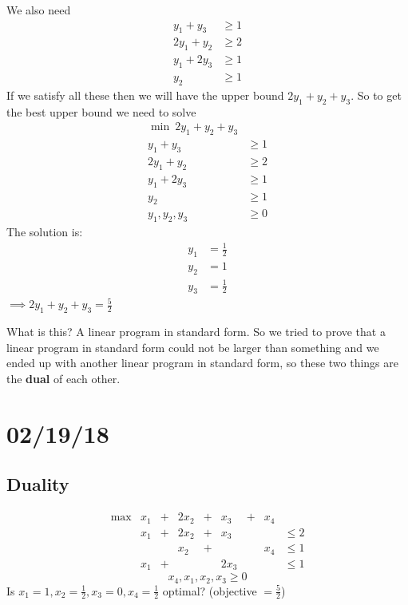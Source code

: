 \documentclass[12 pt]{article}
\begin{document}
          We also need
          \begin{align*}
            y_1 + y_3 & \geq 1
            \\ 2y_1 + y_2 & \geq 2
            \\ y_1 + 2y_3 & \geq 1
            \\ y_2 & \geq 1
          \end{align*}
          If we satisfy all these then we will have the upper bound
          $2y_1+y_2 + y_3$. So to get the best upper bound we need to
          solve
          \begin{align*}
            \min \ 2y_1 + y_2 + y_3 &
            \\ y_1 + y_3 & \geq 1
            \\ 2y_1 + y_2 & \geq 2
            \\ y_1 + 2y_3 & \geq 1
            \\ y_2 & \geq 1
            \\ y_1, y_2, y_3 & \geq 0
          \end{align*}
          The solution is:
          \begin{align*}
            y_1 & = \frac{1}{2}
            \\ y_2 & = 1
            \\ y_3 & = \frac{1}{2}
          \end{align*}
          $\implies 2y_1 + y_2 + y_3 = \frac{5}{2}$

          What is this? A linear program in standard form. So we tried
          to prove that a linear program in standard form could not be
          larger than something and we ended up with another linear
          program in standard form, so these two things are the
          \textbf{dual} of each other.
          \section{02/19/18}
          \subsection{Duality}
          $$\begin{matrix}
            \max & x_1 & + & 2x_2 & + & x_3 & + & x_4
            \\ & x_1 & + & 2x_2 & + & x_3 & & & \leq 2
            \\ &&& x_2 & + &&& x_4 & \leq 1
            \\ & x_1 & + & & & 2x_3 &&& \leq 1
          \end{matrix}$$
          $$x_4,x_1,x_2,x_3 \geq 0$$
          Is $x_1 = 1 , x_2 = \frac{1}{2}, x_3 = 0, x_4 = \frac{1}{2}$
          optimal? (objective $= \frac{5}{2}$)
\end{document}

